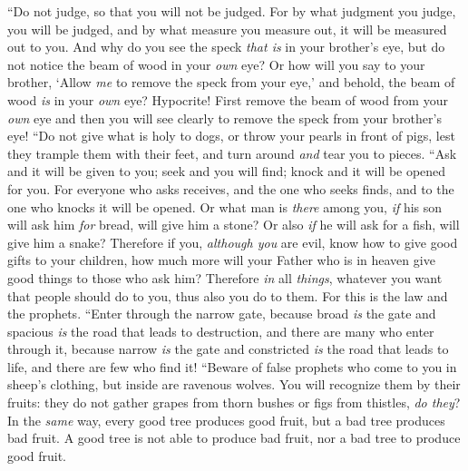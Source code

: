 \begin{biblechapter} %
 “Do not judge, so that you will not be judged.
\verse For by what judgment you judge, you will be judged, and by what measure you measure out, it will be measured out to you.
\verse And why do you see the speck \textit{that is} in your brother’s eye, but do not notice the beam of wood in your \textit{own} eye?
\verse Or how will you say to your brother, ‘Allow \textit{me} to remove the speck from your eye,’ and behold, the beam of wood \textit{is} in your \textit{own} eye?
\verse Hypocrite! First remove the beam of wood from your \textit{own} eye and then you will see clearly to remove the speck from your brother’s eye!
\verse “Do not give what is holy to dogs, or throw your pearls in front of pigs, lest they trample them with their feet, and turn around \textit{and} tear you to pieces.
 “Ask and it will be given to you; seek and you will find; knock and it will be opened for you.
\verse For everyone who asks receives, and the one who seeks finds, and to the one who knocks it will be opened.
\verse Or what man is \textit{there} among you, \textit{if} his son will ask him \textit{for} bread, will give him a stone?
\verse Or also \textit{if} he will ask for a fish, will give him a snake?
\verse Therefore if you, \textit{although you} are evil, know how to give good gifts to your children, how much more will your Father who is in heaven give good things to those who ask him?
\verse Therefore \textit{in} all \textit{things}, whatever you want that people should do to you, thus also you do to them. For this is the law and the prophets.
 “Enter through the narrow gate, because broad \textit{is} the gate and spacious \textit{is} the road that leads to destruction, and there are many who enter through it,
\verse because narrow \textit{is} the gate and constricted \textit{is} the road that leads to life, and there are few who find it!
 “Beware of false prophets who come to you in sheep’s clothing, but inside are ravenous wolves.
\verse You will recognize them by their fruits: they do not gather grapes from thorn bushes or figs from thistles, \textit{do they}?
\verse In the \textit{same} way, every good tree produces good fruit, but a bad tree produces bad fruit.
\verse A good tree is not able to produce bad fruit, nor a bad tree to produce good fruit.

\end{biblechapter}
